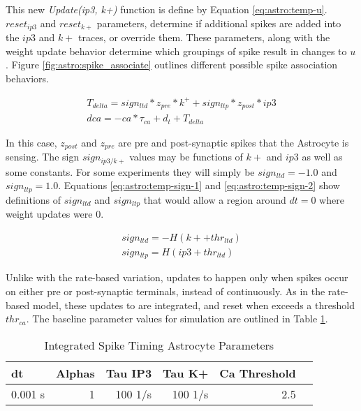 This new \emph{Update(ip3, k+)} function is define by Equation
\ref{eq:astro:temp-u}. $reset_{ip3}$ and $reset_{k+}$ parameters, determine if
additional spikes are added into the $ip3$ and $k+$ traces, or override
them. These parameters, along with the weight update behavior determine which
groupings of spike result in changes to $u$. Figure
\ref{fig:astro:spike_associate} outlines different possible spike association
behaviors.



\begin{align}
T_{delta} = sign_{ltd} * z_{pre} * k^+ + sign_{ltp} * z_{post} * ip3 \\
dca = -ca * \tau_{ca} + d_t + T_{delta} \label{eq:astro:temp-u}
\end{align}

In this case, $z_{post}$ and $z_{pre}$ are pre and post-synaptic spikes that
the Astrocyte is sensing. The sign $sign_{ip3/k+}$ values may be functions
of $k+$ and $ip3$ as well as some constants. For some experiments they will
simply be $sign_{ltd}=-1.0$ and $sign_{ltp}=1.0$. Equations
\ref{eq:astro:temp-sign-1} and \ref{eq:astro:temp-sign-2} show definitions
of $sign_{ltd}$ and $sign_{ltp}$ that would allow a region around $dt=0$
where weight updates were 0.

\begin{align}
sign_{ltd} = -H(k+ + thr_{ltd}) \label{eq:astro:temp-sign-1}\\
sign_{ltp} = H(ip3 + thr_{ltd}) \label{eq:astro:temp-sign-2}
\end{align}

Unlike with the rate-based variation, updates to \ca happen only when spikes
occur on either pre or post-synaptic terminals, instead of continuously. As
in the rate-based model, these updates to \ca are integrated, and reset when \ca
exceeds a threshold $thr_{ca}$. The baseline parameter values for simulation are
outlined in Table \ref{table:istp_params}.

\begin{table}[!htp] \centering
  \caption{Integrated Spike Timing Astrocyte Parameters} \label{table:istp_params}
  \scriptsize
  \begin{tabular}{lrrrrr}\toprule
    dt &Alphas &Tau IP3 &Tau K+ &Ca Threshold \\\midrule
    0.001 s &1 &100 1/s &100 1/s &2.5 \\
    \bottomrule
  \end{tabular}
\end{table}

